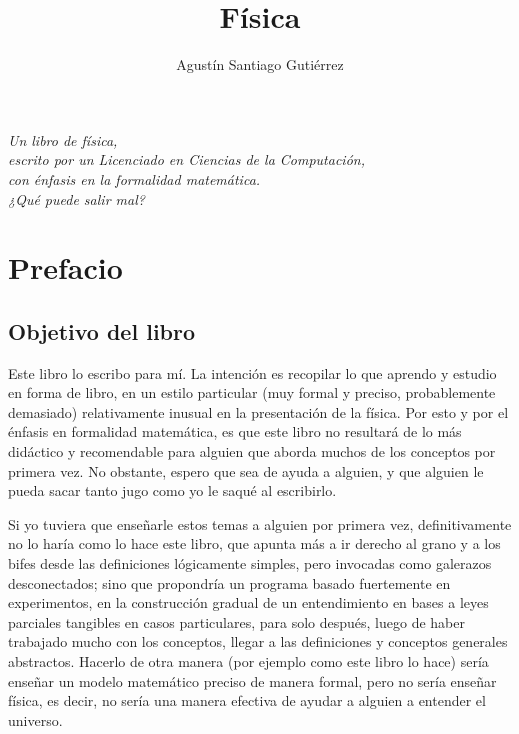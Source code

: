 \documentclass{article}
\title{\huge Física}
\author{Agustín Santiago Gutiérrez}
\date{}
\newlength\longest
\begin{document}
\maketitle

\pagebreak

{

\thispagestyle{empty}
\null\vfill

\settowidth{}

\centering
\parbox{\longest}{%
  \raggedright{\large\itshape%
   Un libro de física,   \\ 
  escrito por un Licenciado en Ciencias de la Computación, \\
  con énfasis en la formalidad matemática. \\ 
  ¿Qué puede salir mal?\par\bigskip
  }   
}


\vfill\vfill

}

\pagebreak

\tableofcontents

\pagebreak

\section{Prefacio}

\subsection{Objetivo del libro}

Este libro lo escribo para mí. La intención es recopilar lo que aprendo y estudio en forma de libro, en un estilo particular (muy 
formal y preciso, probablemente demasiado)
relativamente inusual en la presentación de la física. Por esto y por el énfasis en formalidad matemática, es que este libro
no resultará de lo más didáctico y recomendable para alguien que aborda muchos de los conceptos por primera vez. No obstante,
espero que sea de ayuda a alguien, y que alguien le pueda sacar tanto jugo como yo le saqué al escribirlo.

Si yo tuviera que enseñarle estos temas a alguien por primera vez, definitivamente no lo haría como lo hace este libro, que
apunta más a ir derecho al grano y a los bifes desde las definiciones lógicamente simples, pero invocadas como galerazos desconectados; sino
que propondría un programa basado fuertemente en experimentos, en la construcción gradual de un entendimiento en bases a leyes
parciales tangibles en casos particulares, para solo después, luego de haber trabajado mucho con los conceptos, llegar a las
definiciones y conceptos generales abstractos. Hacerlo de otra manera (por ejemplo como este libro lo hace) sería enseñar un modelo
matemático preciso de manera formal, pero no sería enseñar física, es decir, no sería una manera efectiva de ayudar a alguien a entender
el universo.
\end{document}
